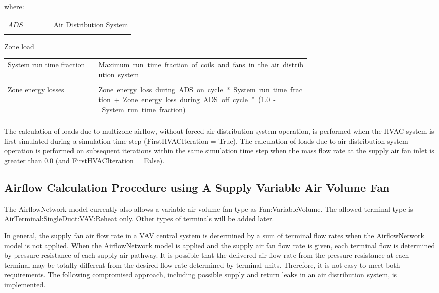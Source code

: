 where:

\begin{tabular}{lp{0.7\linewidth}}
\\
$ADS$ &= Air Distribution System\\
\\
\end{tabular}

Zone load

\begin{tabular}{lp{0.7\linewidth}}
\\
System run time fraction = &Maximum~run~time~fraction~of~coils~and~fans~in~the~air~distribution~system\\
\\
Zone energy losses ~~~~~~~~= &Zone~energy~loss~during~ADS~on~cycle~*~System~run~time~fraction~+~Zone~energy~loss~during~ADS~off~cycle~*~(1.0~-~System~run~time~fraction)\\
\\
\end{tabular}

The calculation of loads due to multizone airflow, without forced air distribution system operation, is performed when the HVAC system is first simulated during a simulation time step (FirstHVACIteration = True). The calculation of loads due to air distribution system operation is performed on subsequent iterations within the same simulation time step when the mass flow rate at the supply air fan inlet is greater than 0.0 (and FirstHVACIteration = False).

\subsection{Airflow Calculation Procedure using A Supply Variable Air Volume Fan}\label{airflow-calculation-procedure-using-a-supply-variable-air-volume-fan}

The AirflowNetwork model currently also allows a variable air volume fan type as Fan:VariableVolume. The allowed terminal type is AirTerminal:SingleDuct:VAV:Reheat only. Other types of terminals will be added later.

In general, the supply fan air flow rate in a VAV central system is determined by a sum of terminal flow rates when the AirflowNetwork model is not applied. When the AirflowNetwork model is applied and the supply air fan flow rate is given, each terminal flow is determined by pressure resistance of each supply air pathway. It is possible that the delivered air flow rate from the pressure resistance at each terminal may be totally different from the desired flow rate determined by terminal units. Therefore, it is not easy to meet both requirements. The following compromised approach, including possible supply and return leaks in an air distribution system, is implemented.


